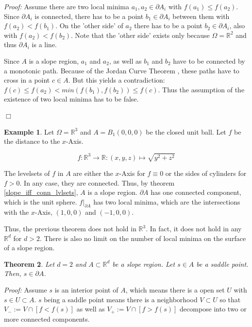 \documentclass[11pt,twoside,twocolumn,a4paper]{article}
\theoremstyle{plain}
\newtheorem{thm}{Theorem}[section] %
\theoremstyle{definition}
\newtheorem{exmp}[thm]{Example} %
\begin{document}
\emph{Proof:} Assume there are two local minima $a_1, a_2 \in \partial A_i$ with $f(a_1) \leq f(a_2)$.
Since $\partial A_i$ is connected, there has to be a point $b_1 \in \partial A_i$ between them with $f(a_2) < f(b_1)$.
On the 'other side' of $a_2$ there has to be a point $b_2 \in \partial A_i$, also with $f(a_2) < f(b_2)$.
Note that the 'other side' exists only because $\Omega = \mathbb R^2$ and thus $\partial A_i$ is a line.

Since $A$ is a slope region, $a_1$ and $a_2$, as well as $b_1$ and $b_2$ have to be connected by a monotonic path.
Because of the Jordan Curve Theorem \cite{jordan1887cours}, these paths have to cross in a point $c \in A$.
But this yields a contradiction: $f(c) \leq f(a_2) < min(f(b_1), f(b_2)) \leq f(c)$.
Thus the assumption of the existence of two local minima has to be false.

\hfill $\Box$

\begin{exmp}
Let $\Omega = \mathbb R^3$ and $A = B_1(0,0,0)$ be the closed unit ball.
Let $f$ be the distance to the $x$-Axis. 

\begin{equation*}
f: \mathbb R^3 \to \mathbb R: (x,y,z) \mapsto \sqrt{y^2 + z^2}
\end{equation*}

The levelsets of $f$ in $A$ are either the $x$-Axis for $f \equiv 0$ or the sides of cylinders for $f > 0$.
In any case, they are connected.
Thus, by theorem \ref{slope_iff_conn_lvlsets}, $A$ is a slope region.
$\partial A$ has one connected component, which is the unit sphere.
$f|_{\partial A}$ has two local minima, which are the intersections with the $x$-Axis, $(1,0,0)$ and $(-1,0,0)$.
\end{exmp}

Thus, the previous theorem does not hold in $\mathbb R^3$.
In fact, it does not hold in any $\mathbb R^d$ for $d > 2$.
There is also no limit on the number of local minima on the surface of a slope region.

\begin{thm}
\label{thm:saddle_on_border}
Let $d = 2$ and $A \subset \mathbb R^d$ be a slope region.
Let $s \in A$ be a saddle point.
Then, $s \in \partial A$.
\end{thm}

\emph{Proof:} Assume $s$ is an interior point of $A$, which means there is a open set $U$ with $s \in U \subset A$.
$s$ being a saddle point means there is a neighborhood $V \subset U$ so that $V_- := V \cap [f < f(s)]$ as well as $V_+ := V \cap [f > f(s)]$ decompose into two or more connected components.
\end{document}
